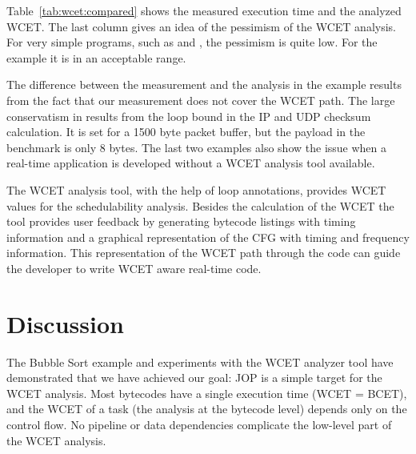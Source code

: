 Table~\ref{tab:wcet:compared} shows the measured execution time and
the analyzed WCET. The last column gives an idea of the pessimism of
the WCET analysis. For very simple programs, such as  and
, the pessimism is quite low. For the 
example it is in an acceptable range.
%
\begin{table}
    \caption{Measured and estimated WCETs with results in clock cycles}
    \label{tab:wcet:compared}
\end{table}
%
The difference between the measurement and the analysis in the
 example results from the fact that our measurement does
not cover the WCET path. The large conservatism in 
results from the loop bound in the IP and UDP checksum calculation.
It is set for a 1500 byte packet buffer, but the payload in the
benchmark is only 8 bytes. The last two examples also show the issue
when a real-time application is developed without a WCET analysis
tool available.

The WCET analysis tool, with the help of loop annotations, provides
WCET values for the schedulability analysis. Besides the calculation
of the WCET the tool provides user feedback by generating bytecode
listings with timing information and a graphical representation of
the CFG with timing and frequency information. This representation
of the WCET path through the code can guide the developer to write
WCET aware real-time code.

\section{Discussion}

The Bubble Sort example and experiments with the WCET analyzer tool
have demonstrated that we have achieved our goal: JOP is a simple
target for the WCET analysis. Most bytecodes have a single execution
time (WCET = BCET), and the WCET of a task (the analysis at the
bytecode level) depends only on the control flow. No pipeline or
data dependencies complicate the low-level part of the WCET
analysis.


